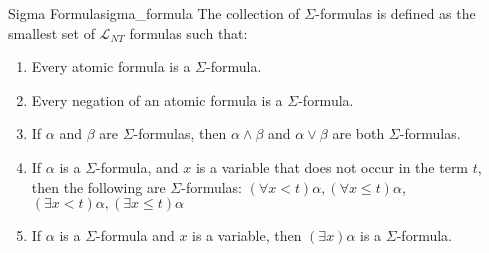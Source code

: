 \begin{definition}{Sigma Formula}{sigma_formula}
The collection of $\Sigma$-formulas is defined as the smallest set of $\mathcal{L}_{N T}$ formulas such that:
\begin{enumerate}
    \item Every atomic formula is a $\Sigma$-formula.
    \item Every negation of an atomic formula is a $\Sigma$-formula.
    \item If $\alpha$ and $\beta$ are $\Sigma$-formulas, then $\alpha \wedge \beta$ and $\alpha \vee \beta$ are both $\Sigma$-formulas.
    \item If $\alpha$ is a $\Sigma$-formula, and $x$ is a variable that does not occur in the term $t$, then the following are $\Sigma$-formulas: $(\forall x<t) \alpha,(\forall x \leq t) \alpha$, $(\exists x<t) \alpha,(\exists x \leq t) \alpha$
    \item If $\alpha$ is a $\Sigma$-formula and $x$ is a variable, then $(\exists x) \alpha$ is a $\Sigma$-formula.
\end{enumerate}
\end{definition}
